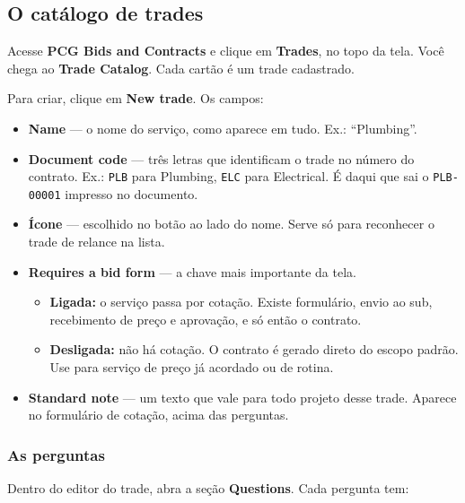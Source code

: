 \documentclass[11pt,a4paper]{article}
\newcommand{\ui}[1]{\textbf{\textsf{#1}}}
\begin{document}
\subsection{O catálogo de trades}

Acesse \ui{PCG Bids and Contracts} e clique em \ui{Trades}, no topo da tela.
Você chega ao \ui{Trade Catalog}. Cada cartão é um trade cadastrado.

Para criar, clique em \ui{New trade}. Os campos:

\begin{itemize}
  \item \ui{Name} — o nome do serviço, como aparece em tudo. Ex.: ``Plumbing''.

  \item \ui{Document code} — três letras que identificam o trade no número do
  contrato. Ex.: \texttt{PLB} para Plumbing, \texttt{ELC} para Electrical. É
  daqui que sai o \texttt{PLB-00001} impresso no documento.

  \item \textbf{Ícone} — escolhido no botão ao lado do nome. Serve só para
  reconhecer o trade de relance na lista.

  \item \ui{Requires a bid form} — a chave mais importante da tela.
  \begin{itemize}
    \item \textbf{Ligada:} o serviço passa por cotação. Existe formulário, envio
    ao sub, recebimento de preço e aprovação, e só então o contrato.
    \item \textbf{Desligada:} não há cotação. O contrato é gerado direto do
    escopo padrão. Use para serviço de preço já acordado ou de rotina.
  \end{itemize}

  \item \ui{Standard note} — um texto que vale para todo projeto desse trade.
  Aparece no formulário de cotação, acima das perguntas.
\end{itemize}

\subsubsection{As perguntas}

Dentro do editor do trade, abra a seção \ui{Questions}. Cada pergunta tem:
\end{document}
